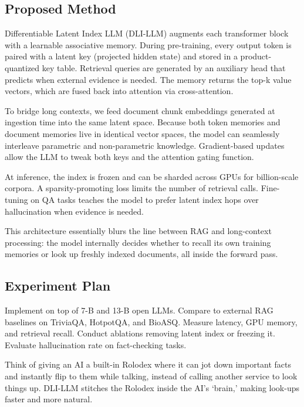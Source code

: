 \documentclass[
]{article}
\begin{document}
\hypertarget{proposed-method}{%
\subsection{Proposed Method}\label{proposed-method}}

Differentiable Latent Index LLM (DLI-LLM) augments each transformer
block with a learnable associative memory. During pre-training, every
output token is paired with a latent key (projected hidden state) and
stored in a product-quantized key table. Retrieval queries are generated
by an auxiliary head that predicts when external evidence is needed. The
memory returns the top-k value vectors, which are fused back into
attention via cross-attention.

To bridge long contexts, we feed document chunk embeddings generated at
ingestion time into the same latent space. Because both token memories
and document memories live in identical vector spaces, the model can
seamlessly interleave parametric and non-parametric knowledge.
Gradient-based updates allow the LLM to tweak both keys and the
attention gating function.

At inference, the index is frozen and can be sharded across GPUs for
billion-scale corpora. A sparsity-promoting loss limits the number of
retrieval calls. Fine-tuning on QA tasks teaches the model to prefer
latent index hops over hallucination when evidence is needed.

This architecture essentially blurs the line between RAG and
long-context processing: the model internally decides whether to recall
its own training memories or look up freshly indexed documents, all
inside the forward pass.

\hypertarget{experiment-plan}{%
\subsection{Experiment Plan}\label{experiment-plan}}

Implement on top of 7-B and 13-B open LLMs. Compare to external RAG
baselines on TriviaQA, HotpotQA, and BioASQ. Measure latency, GPU
memory, and retrieval recall. Conduct ablations removing latent index or
freezing it. Evaluate hallucination rate on fact-checking tasks.

Think of giving an AI a built-in Rolodex where it can jot down important
facts and instantly flip to them while talking, instead of calling
another service to look things up. DLI-LLM stitches the Rolodex inside
the AI's `brain,' making look-ups faster and more natural.
\end{document}
